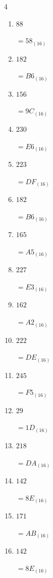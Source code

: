 \begin{multicols}{4}
\begin{enumerate}
        $=8_{(16)}$

  \item $88$

        $=58_{(16)}$

  \item $182$

        $=B6_{(16)}$

  \item $156$

        $=9C_{(16)}$

  \item $230$

        $=E6_{(16)}$

  \item $223$

        $=DF_{(16)}$

  \item $182$

        $=B6_{(16)}$

\columnbreak %

  \item $165$

        $=A5_{(16)}$

  \item $227$

        $=E3_{(16)}$

  \item $162$

        $=A2_{(16)}$

  \item $222$

        $=DE_{(16)}$

  \item $245$

        $=F5_{(16)}$

  \item $29$

        $=1D_{(16)}$

  \item $218$

        $=DA_{(16)}$

  \item $142$

        $=8E_{(16)}$

  \item $171$

        $=AB_{(16)}$

  \item $142$

        $=8E_{(16)}$


\end{enumerate}
\end{multicols}
